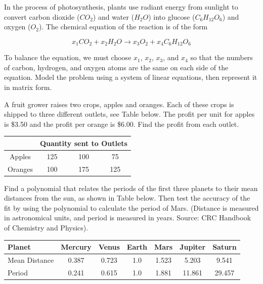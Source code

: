 \begin{questions}
 
 
 \question  In the process of photosynthesis, plants use radiant energy from sunlight to convert carbon dioxide ($CO_2$) and water ($H_2O$) into glucose ($C_6H_{12}O_6$) and oxygen ($O_2$).  The chemical equation of the reaction is of the form

\[ x_1 CO_2 + x_2 H_2O \longrightarrow x_3 O_2 + x_4 C_6H_{12}O_6 \]

To balance the equation, we must choose $x_1$, $x_2$, $x_3$, and $x_4$ so that the numbers of carbon, hydrogen, and oxygen atoms are the same on each side of the equation.   Model the problem using a system of linear equations, then represent it in matrix form.  




\question A fruit grower raises two crops, apples and oranges.  Each of these crops is shipped to three different outlets, see Table below.  The profit per unit for apples is \$3.50 and the profit per orange is \$6.00.  Find the profit from each outlet.




\begin{tabular}{c|ccc}
  & \multicolumn{3}{c}{Quantity sent to Outlets }  \\ 
 \hline
 Apples &   125  &  100  & 75 \\ 
  Oranges &   100  &  175  & 125 \\ 
 
 \end{tabular}






\question Find a polynomial that relates the periods of the first three planets to their mean distances from the sun, as shown in Table below.  Then test the accuracy of the fit by using the polynomial to calculate the period of Mars.  (Distance is measured in astronomical units, and period is measured in years.  Source: CRC Handbook of Chemistry and Physics).

\begin{tabular}{l|cccccc}
 \hline
 Planet & Mercury & Venus  & Earth  &  Mars  &  Jupiter  & Saturn\\
 \hline
Mean Distance & 0.387 & 0.723  & 1.0  &  1.523  &  5.203  & 9.541\\
Period & 0.241 & 0.615  & 1.0  &  1.881  &  11.861  & 29.457\\
 \hline 
\end{tabular}








\end{questions}
